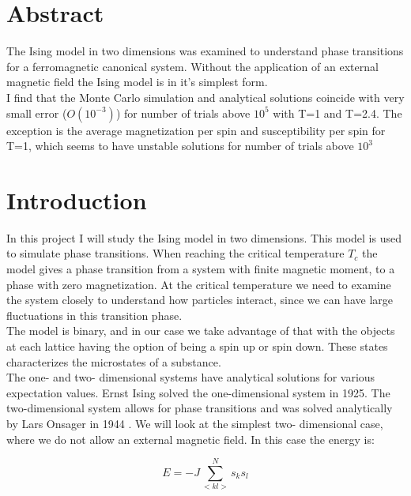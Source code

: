 

\section{Abstract}
The Ising model in two dimensions was examined to understand phase transitions for a ferromagnetic canonical system. Without the application of an external magnetic field the Ising model is in it's simplest form.\\


I find that the Monte Carlo simulation and analytical solutions coincide with very small error ($O(10^{-3})$) for number of trials above $10^5$ with T=1 and T=2.4. The exception is the average magnetization per spin and susceptibility per spin for T=1, which seems to have unstable solutions  for number of trials above $10^3$





\section{Introduction}
In this project I will study the Ising model in two dimensions. This model is used to simulate phase transitions. When reaching the critical temperature $T_c$ the model gives a phase transition from a system with finite magnetic moment, to a phase with zero magnetization. At the critical temperature we need to examine the system closely to understand how particles interact, since we can have large fluctuations in this transition phase.\\



The model is binary, and in our case we take advantage of that with the objects at each lattice having the option of being a spin up or spin down. These states characterizes the microstates of a substance. \cite{spin}\\




The one- and two- dimensional systems have analytical solutions for various expectation values. Ernst Ising solved the one-dimensional system in 1925. The two-dimensional system allows for phase transitions and was solved analytically by Lars Onsager in 1944 \cite{ising}.  We will look at the simplest two- dimensional case, where we do not allow an external magnetic field. In this case the energy is:


\begin{equation}
E = -J\sum_{<kl>}^Ns_ks_l
\end{equation}

